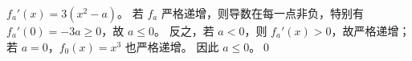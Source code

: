 $f_a'(x)=3(x^2-a)$。
若 $f_a$ 严格递增，则导数在每一点非负，特别有 $f_a'(0)=-3a\ge0$，故 $a\le0$。
反之，若 $a<0$，则 $f_a'(x)>0$，故严格递增；若 $a=0$，$f_0(x)=x^3$ 也严格递增。
因此 $\boxed{a\le0}$。\qed
